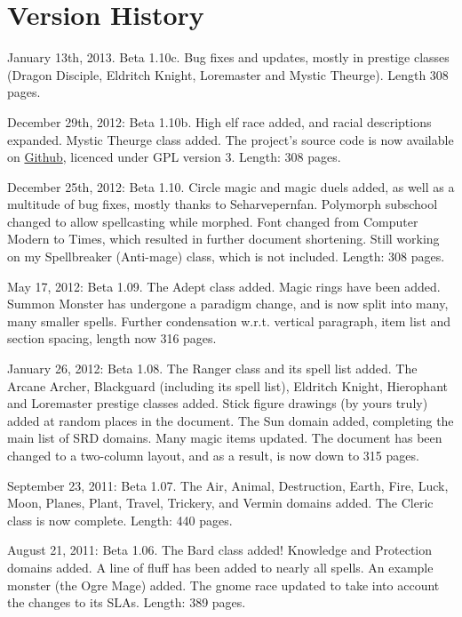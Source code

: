\section{Version History}
\begin{list}{}{\leftmargin=1em}
 \item January 13th, 2013. Beta 1.10c. Bug fixes and updates, mostly in prestige classes (Dragon Disciple, Eldritch Knight, Loremaster and Mystic Theurge). Length 308 pages.
 \item December 29th, 2012: Beta 1.10b. High elf race added, and racial descriptions expanded. Mystic Theurge class added. The project's source code is now available on \href{https://github.com/Ernir/VancianToPsionics}{Github}, licenced under GPL version 3. Length: 308 pages.
 \item December 25th, 2012: Beta 1.10. Circle magic and magic duels added, as well as a multitude of bug fixes, mostly thanks to Seharvepernfan. Polymorph subschool changed to allow spellcasting while morphed. Font changed from Computer Modern to Times, which resulted in further document shortening. Still working on my Spellbreaker (Anti-mage) class, which is not included. Length: 308 pages.
 \item May 17, 2012: Beta 1.09. The Adept class added. Magic rings have been added. Summon Monster has undergone a paradigm change, and is now split into many, many smaller spells. Further condensation w.r.t. vertical paragraph, item list and section spacing, length now 316 pages.
 \item January 26, 2012: Beta 1.08. The Ranger class and its spell list added. The Arcane Archer, Blackguard (including its spell list), Eldritch Knight, Hierophant and Loremaster prestige classes added. Stick figure drawings (by yours truly) added at random places in the document. The Sun domain added, completing the main list of SRD domains. Many magic items updated. The document has been changed to a two-column layout, and as a result, is now down to 315 pages.
 \item September 23, 2011: Beta 1.07. The Air, Animal, Destruction, Earth, Fire, Luck, Moon, Planes, Plant, Travel, Trickery, and Vermin domains added. The Cleric class is now complete. Length: 440 pages.
 \item August 21, 2011: Beta 1.06. The Bard class added! Knowledge and Protection domains added. A line of fluff has been added to nearly all spells. An example monster (the Ogre Mage) added. The gnome race updated to take into account the changes to its SLAs. Length: 389 pages.

\end{list}

